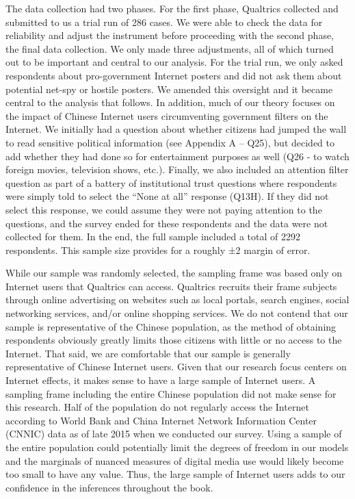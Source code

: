 \documentclass[
  letterpaper,
  DIV=11,
  numbers=noendperiod]{scrartcl}
\begin{document}
The data collection had two phases. For the first phase, Qualtrics
collected and submitted to us a trial run of 286 cases. We were able to
check the data for reliability and adjust the instrument before
proceeding with the second phase, the final data collection. We only
made three adjustments, all of which turned out to be important and
central to our analysis. For the trial run, we only asked respondents
about pro-government Internet posters and did not ask them about
potential net-spy or hostile posters. We amended this oversight and it
became central to the analysis that follows. In addition, much of our
theory focuses on the impact of Chinese Internet users circumventing
government filters on the Internet. We initially had a question about
whether citizens had jumped the wall to read sensitive political
information (see Appendix A -- Q25), but decided to add whether they had
done so for entertainment purposes as well (Q26 - to watch foreign
movies, television shows, etc.). Finally, we also included an attention
filter question as part of a battery of institutional trust questions
where respondents were simply told to select the ``None at all''
response (Q13H). If they did not select this response, we could assume
they were not paying attention to the questions, and the survey ended
for these respondents and the data were not collected for them. In the
end, the full sample included a total of 2292 respondents. This sample
size provides for a roughly ±2 margin of error.

While our sample was randomly selected, the sampling frame was based
only on Internet users that Qualtrics can access. Qualtrics recruits
their frame subjects through online advertising on websites such as
local portals, search engines, social networking services, and/or online
shopping services. We do not contend that our sample is representative
of the Chinese population, as the method of obtaining respondents
obviously greatly limits those citizens with little or no access to the
Internet. That said, we are comfortable that our sample is generally
representative of Chinese Internet users. Given that our research focus
centers on Internet effects, it makes sense to have a large sample of
Internet users. A sampling frame including the entire Chinese population
did not make sense for this research. Half of the population do not
regularly access the Internet according to World Bank and China Internet
Network Information Center (CNNIC) data as of late 2015 when we
conducted our survey. Using a sample of the entire population could
potentially limit the degrees of freedom in our models and the marginals
of nuanced measures of digital media use would likely become too small
to have any value. Thus, the large sample of Internet users adds to our
confidence in the inferences throughout the book.
\end{document}
